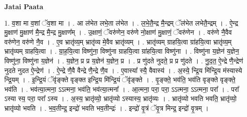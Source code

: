\documentclass[17pt]{extarticle}
\begin{document}
\textbf{Jatai Paata} \newline

1. व॒शा मा व॒शां ॅव॒शा मा । . आ ल॑भेत लभे॒ता ल॑भेत । . ल॒भे॒तै॒न्द्र मै॒न्द्रम् ॅल॑भेत लभेतै॒न्द्रम् । . ऐ॒न्द्र मु॒क्षाण॑ मु॒क्षाण॑ मै॒न्द्र मै॒न्द्र मु॒क्षाण᳚म् । . उ॒क्षाणं॒ ॅवरु॑णेन॒ वरु॑णे नो॒क्षाण॑ मु॒क्षाणं॒ ॅवरु॑णेन । . वरु॑णे नै॒वैव वरु॑णेन॒ वरु॑णे नै॒व । . ए॒व भ्रातृ॑व्य॒म् भ्रातृ॑व्य मे॒वैव भ्रातृ॑व्यम् । . भ्रातृ॑व्यम् ग्राहयि॒त्वा ग्रा॑हयि॒त्वा भ्रातृ॑व्य॒म् भ्रातृ॑व्यम् ग्राहयि॒त्वा । . ग्रा॒ह॒यि॒त्वा विष्णु॑ना॒ विष्णु॑ना ग्राहयि॒त्वा ग्रा॑हयि॒त्वा विष्णु॑ना । . विष्णु॑ना य॒ज्ञेन॑ य॒ज्ञेन॒ विष्णु॑ना॒ विष्णु॑ना य॒ज्ञेन॑ । . य॒ज्ञेन॒ प्र प्र य॒ज्ञेन॑ य॒ज्ञेन॒ प्र । . प्र णु॑दते नुदते॒ प्र प्र णु॑दते । . नु॒द॒त॒ ऐ॒न्द्रे णै॒न्द्रेण॑ नुदते नुदत ऐ॒न्द्रेण॑ । . ऐ॒न्द्रे णै॒वै वैन्द्रे णै॒न्द्रे णै॒व । . ए॒वास्या᳚ स्यै॒ वैवास्य॑ । . अ॒स्ये॒ न्द्रि॒य मि॑न्द्रि॒य म॑स्यास्ये न्द्रि॒यम् । . इ॒न्द्रि॒यं ॅवृ॑ङ्क्ते वृङ्क्त इन्द्रि॒य मि॑न्द्रि॒यं ॅवृ॑ङ्क्ते । . वृ॒ङ्क्ते॒ भव॑ति॒ भव॑ति वृङ्क्ते वृङ्क्ते॒ भव॑ति । . भव॑त्या॒त्मना॒ ऽऽत्मना॒ भव॑ति॒ भव॑त्या॒त्मना᳚ । . आ॒त्मना॒ परा॒ परा॒ ऽऽत्मना॒ ऽऽत्मना॒ परा᳚ । . परा᳚ ऽस्या स्य॒ परा॒ परा᳚ ऽस्य । . अ॒स्य॒ भ्रातृ॑व्यो॒ भ्रातृ॑व्यो ऽस्यास्य॒ भ्रातृ॑व्यः । . भ्रातृ॑व्यो भवति भवति॒ भ्रातृ॑व्यो॒ भ्रातृ॑व्यो भवति । . भ॒व॒तीन्द्र॒ इन्द्रो॑ भवति भव॒तीन्द्रः॑ । . इन्द्रो॑ वृ॒त्रं ॅवृ॒त्र मिन्द्र॒ इन्द्रो॑ वृ॒त्रम् । \newline
\end{document}
